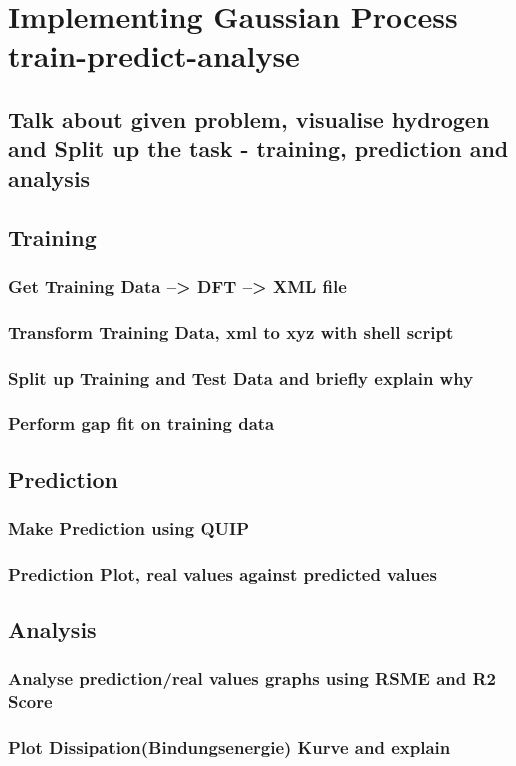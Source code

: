 \chapter{Implementing Gaussian Process train-predict-analyse}

\section{Talk about given problem, visualise hydrogen and Split up the task - training, prediction and analysis}

\section{Training}
\subsection{Get Training Data --> DFT --> XML file}
\subsection{Transform Training Data, xml to xyz with shell script}
\subsection{Split up Training and Test Data and briefly explain why}
\subsection{Perform gap fit on training data}

\section{Prediction}
\subsection{Make Prediction using QUIP}
\subsection{Prediction Plot, real values against predicted values}

\section{Analysis}
\subsection{Analyse prediction/real values graphs using RSME and R2 Score}
\subsection{Plot Dissipation(Bindungsenergie) Kurve and explain }


